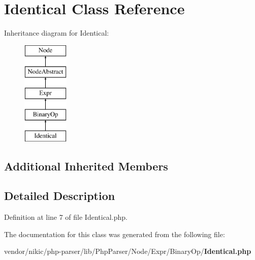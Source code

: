 \section{Identical Class Reference}
\label{class_php_parser_1_1_node_1_1_expr_1_1_binary_op_1_1_identical}
Inheritance diagram for Identical\+:\begin{figure}[H]
\begin{center}
\leavevmode
\includegraphics[height=5.000000cm]{class_php_parser_1_1_node_1_1_expr_1_1_binary_op_1_1_identical}
\end{center}
\end{figure}
\subsection*{Additional Inherited Members}


\subsection{Detailed Description}


Definition at line 7 of file Identical.\+php.



The documentation for this class was generated from the following file\+:\begin{DoxyCompactItemize}
\item 
vendor/nikic/php-\/parser/lib/\+Php\+Parser/\+Node/\+Expr/\+Binary\+Op/{\bf Identical.\+php}\end{DoxyCompactItemize}
